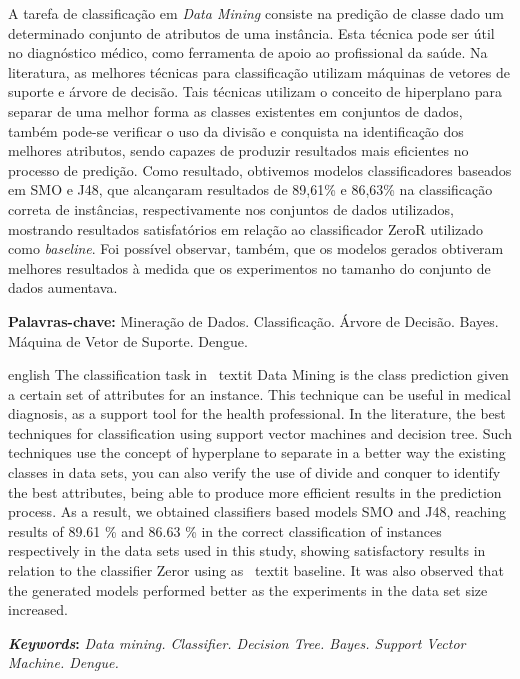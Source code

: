 \documentclass[
	12pt,				%
	openright,			%
	oneside,	
	a4paper,				%
	english,				%
	brazil				%
]{abntex2/abntex2} %
\begin{document}
\setlength{\absparsep}{18pt} %
\begin{resumo}

 	A tarefa de classificação em \textit{Data Mining} consiste na predição de classe dado um determinado conjunto de atributos de uma instância. Esta técnica pode ser útil no diagnóstico médico, como ferramenta de apoio ao profissional da saúde. Na literatura, as melhores técnicas para classificação utilizam máquinas de vetores de suporte e árvore de decisão. Tais técnicas utilizam o conceito de hiperplano para separar de uma melhor forma as classes existentes em conjuntos de dados, também pode-se verificar o uso da divisão e conquista na identificação dos melhores atributos, sendo capazes de produzir resultados mais eficientes no processo de predição. Como resultado, obtivemos modelos classificadores baseados em SMO e J48, que alcançaram resultados de 89,61\% e 86,63\% na classificação correta de instâncias, respectivamente nos conjuntos de dados utilizados, mostrando resultados satisfatórios em relação ao classificador ZeroR utilizado como \textit{baseline}. Foi possível observar, também, que os modelos gerados obtiveram melhores resultados à medida que os experimentos no tamanho do conjunto de dados aumentava.

 \textbf{Palavras-chave:} Mineração de Dados. Classificação. Árvore de Decisão. Bayes. Máquina de Vetor de Suporte. Dengue.

\end{resumo}


\begin{resumo}[ABSTRACT]
 \begin{otherlanguage*}{english}
   The classification task in \ textit {Data Mining} is the class prediction given a certain set of attributes for an instance. This technique can be useful in medical diagnosis, as a support tool for the health professional. In the literature, the best techniques for classification using support vector machines and decision tree. Such techniques use the concept of hyperplane to separate in a better way the existing classes in data sets, you can also verify the use of divide and conquer to identify the best attributes, being able to produce more efficient results in the prediction process. As a result, we obtained classifiers based models SMO and J48, reaching results of 89.61 \% and 86.63 \% in the correct classification of instances respectively in the data sets used in this study, showing satisfactory results in relation to the classifier Zeror using as \ textit {baseline}. It was also observed that the generated models performed better as the experiments in the data set size increased.

   \vspace{\onelineskip}
 
   \noindent 
   \textbf{\textit{Keywords}:} \textit{Data mining. Classifier. Decision Tree. Bayes. Support Vector Machine. Dengue.}
 \end{otherlanguage*}
\end{resumo}
\end{document}

